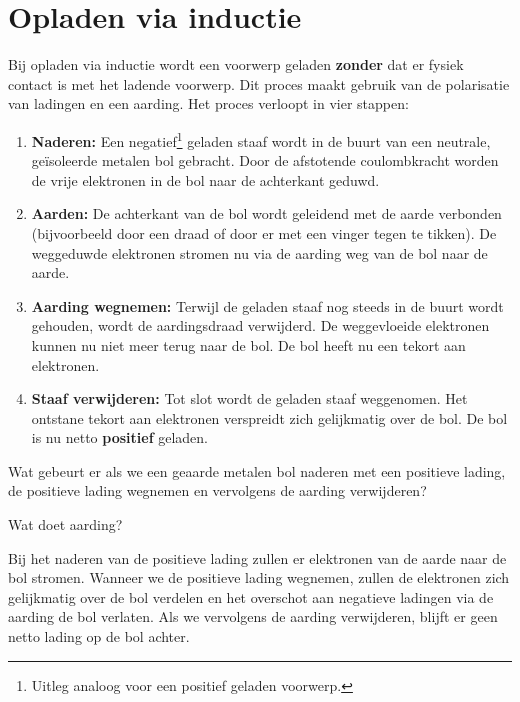 \documentclass{ximera}
\begin{document}
\section{Opladen via inductie}
Bij opladen via inductie wordt een voorwerp geladen \textbf{zonder} dat er fysiek contact is met het ladende voorwerp. Dit proces maakt gebruik van de polarisatie van ladingen en een aarding. Het proces verloopt in vier stappen:

\begin{enumerate}
    \item \textbf{Naderen:} Een negatief\footnote{Uitleg analoog voor een positief geladen voorwerp.} geladen staaf wordt in de buurt van een neutrale, geïsoleerde metalen bol gebracht. Door de afstotende coulombkracht worden de vrije elektronen in de bol naar de achterkant geduwd.
    \item \textbf{Aarden:} De achterkant van de bol wordt geleidend met de aarde verbonden (bijvoorbeeld door een draad of door er met een vinger tegen te tikken). De weggeduwde elektronen stromen nu via de aarding weg van de bol naar de aarde.
    \item \textbf{Aarding wegnemen:} Terwijl de geladen staaf nog steeds in de buurt wordt gehouden, wordt de aardingsdraad verwijderd. De weggevloeide elektronen kunnen nu niet meer terug naar de bol. De bol heeft nu een tekort aan elektronen.
    \item \textbf{Staaf verwijderen:} Tot slot wordt de geladen staaf weggenomen. Het ontstane tekort aan elektronen verspreidt zich gelijkmatig over de bol. De bol is nu netto \textbf{positief} geladen.
\end{enumerate}

\begin{question}
    Wat gebeurt er als we een geaarde metalen bol naderen met een positieve lading, de positieve lading wegnemen en vervolgens de aarding verwijderen?
    \begin{multipleChoice}
    \end{multipleChoice}

    \begin{hint}
        Wat doet aarding?
    \end{hint}

    \begin{solution}\nl
        Bij het naderen van de positieve lading zullen er elektronen van de aarde naar de bol stromen. Wanneer we de positieve lading wegnemen, zullen de elektronen zich gelijkmatig over de bol verdelen en het overschot aan negatieve ladingen via de aarding de bol verlaten. Als we vervolgens de aarding verwijderen, blijft er geen netto lading op de bol achter.
    \end{solution}
\end{question}
\end{document}
